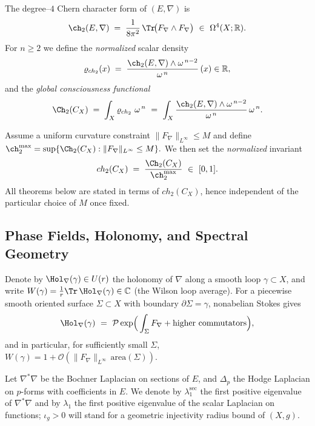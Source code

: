 \begin{defn}\label{def:ch2-hat-rigorous}
The degree--$4$ Chern character form of $(E,\nabla)$ is
\[
\ch_2(E,\nabla)\;=\;\frac{1}{8\pi^2}\,\Tr\!\big(F_\nabla\wedge F_\nabla\big)\ \in\ \Omega^4(X;\mathbb{R}).
\]
For $n\ge 2$ we define the \emph{normalized} scalar density
\[
\varrho_{ch_2}(x)\;=\;\frac{\ch_2(E,\nabla)\wedge \omega^{\,n-2}}{\omega^{\,n}}\,(x)\in\mathbb{R},
\]
and the \emph{global consciousness functional}
\[
\Ch_2(C_X)\;=\;\int_X \varrho_{ch_2}\ \omega^{\,n}\ =\ \int_X \frac{\ch_2(E,\nabla)\wedge \omega^{\,n-2}}{\omega^{\,n}}\,\omega^{\,n}.
\]
\end{defn}

\begin{remark}\label{rem:range-rigorous}
Assume a uniform curvature constraint
$
\|F_\nabla\|_{L^\infty}\le M
$
and define
$
\ch_2^{\max}=\sup\{\Ch_2(C_X): \|F_\nabla\|_{L^\infty}\le M\}.
$
We then set the \emph{normalized} invariant
\[
ch_2(C_X)\;=\;\frac{\Ch_2(C_X)}{\ch_2^{\max}}\ \in\ [0,1].
\]
All theorems below are stated in terms of $ch_2(C_X)$, hence independent of the particular choice of $M$ once fixed.
\end{remark}

\subsection{Phase Fields, Holonomy, and Spectral Geometry}

Denote by $\Hol_\nabla(\gamma)\in U(r)$ the holonomy of $\nabla$ along a smooth loop $\gamma\subset X$, and write
$
W(\gamma)=\frac{1}{r}\Tr\,\Hol_\nabla(\gamma)\in \mathbb{C}
$
(the Wilson loop average). For a piecewise smooth oriented surface $\Sigma\subset X$ with boundary $\partial\Sigma=\gamma$, nonabelian Stokes gives
\[
\Hol_\nabla(\gamma)\ =\ \mathcal{P}\exp\!\Big(\int_\Sigma F_\nabla + \text{higher commutators}\Big),
\]
and in particular, for sufficiently small $\Sigma$,
$
W(\gamma)=1+\mathcal{O}(\|F_\nabla\|_{L^\infty}\,\mathrm{area}(\Sigma)).
$

Let $\nabla^\ast\nabla$ be the Bochner Laplacian on sections of $E$, and $\Delta_p$ the Hodge Laplacian on $p$-forms with coefficients in $E$. We denote by $\lambda_1^\mathrm{sec}$ the first positive eigenvalue of $\nabla^\ast\nabla$ and by $\lambda_1$ the first positive eigenvalue of the scalar Laplacian on functions; $\iota_g>0$ will stand for a geometric injectivity radius bound of $(X,g)$.

